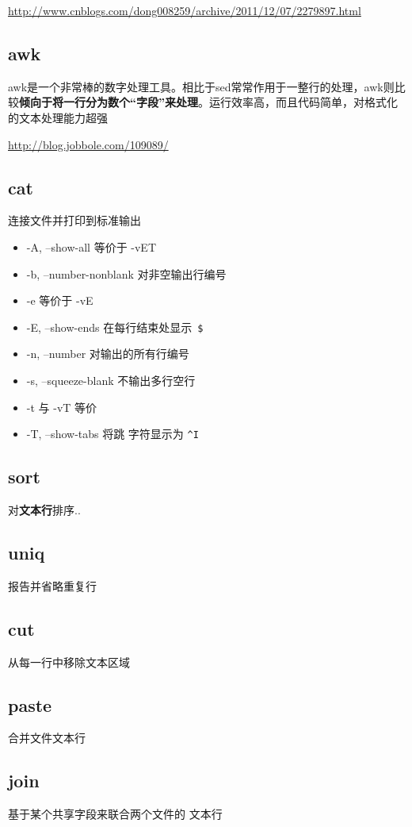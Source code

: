 \documentclass[UTF8,a4paper,12pt]{ctexbook}
\begin{document}
		\url{http://www.cnblogs.com/dong008259/archive/2011/12/07/2279897.html}
		
		\subsection{awk}awk是一个非常棒的数字处理工具。相比于sed常常作用于一整行的处理，awk则比较\textbf{倾向于将一行分为数个“字段”来处理}。运行效率高，而且代码简单，对格式化的文本处理能力超强
		
		\url{http://blog.jobbole.com/109089/}	
		
		\subsection{cat} 连接文件并打印到标准输出
			\begin{itemize}
				\item -A, --show-all 等价于 -vET
				\item -b, --number-nonblank 对非空输出行编号
				\item -e 等价于 -vE
				\item -E, --show-ends 在每行结束处显示\verb| $|
				\item -n, --number 对输出的所有行编号
				\item -s, --squeeze-blank 不输出多行空行
				\item -t 与 -vT 等价
				\item -T, --show-tabs 将跳 字符显示为 \verb|^I|
			\end{itemize}
		
		\subsection{sort} 对\textbf{文本行}排序..
		
		\subsection{uniq} 报告并省略重复行
		
		\subsection{cut} 从每一行中移除文本区域
		
		\subsection{paste} 合并文件文本行
		
		\subsection{join} 基于某个共享字段来联合两个文件的 文本行
		
\end{document}
